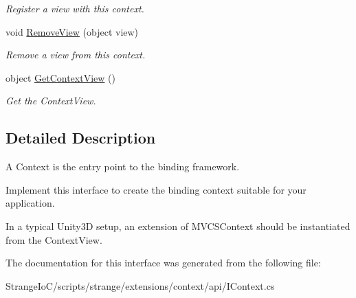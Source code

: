 \begin{DoxyCompactItemize}
\begin{DoxyCompactList}\small\item\em Register a view with this context. \end{DoxyCompactList}\item 
\hypertarget{interfacestrange_1_1extensions_1_1context_1_1api_1_1_i_context_afe786060cd387a581974444dc21231bf}{void \hyperlink{interfacestrange_1_1extensions_1_1context_1_1api_1_1_i_context_afe786060cd387a581974444dc21231bf}{Remove\-View} (object view)}\label{interfacestrange_1_1extensions_1_1context_1_1api_1_1_i_context_afe786060cd387a581974444dc21231bf}

\begin{DoxyCompactList}\small\item\em Remove a view from this context. \end{DoxyCompactList}\item 
\hypertarget{interfacestrange_1_1extensions_1_1context_1_1api_1_1_i_context_aabe56e5b66c8d670507117774d094587}{object \hyperlink{interfacestrange_1_1extensions_1_1context_1_1api_1_1_i_context_aabe56e5b66c8d670507117774d094587}{Get\-Context\-View} ()}\label{interfacestrange_1_1extensions_1_1context_1_1api_1_1_i_context_aabe56e5b66c8d670507117774d094587}

\begin{DoxyCompactList}\small\item\em Get the Context\-View. \end{DoxyCompactList}\end{DoxyCompactItemize}


\subsection{Detailed Description}
A Context is the entry point to the binding framework. 

Implement this interface to create the binding context suitable for your application.

In a typical Unity3\-D setup, an extension of M\-V\-C\-S\-Context should be instantiated from the Context\-View. 

The documentation for this interface was generated from the following file\-:\begin{DoxyCompactItemize}
\item 
Strange\-Io\-C/scripts/strange/extensions/context/api/I\-Context.\-cs\end{DoxyCompactItemize}
